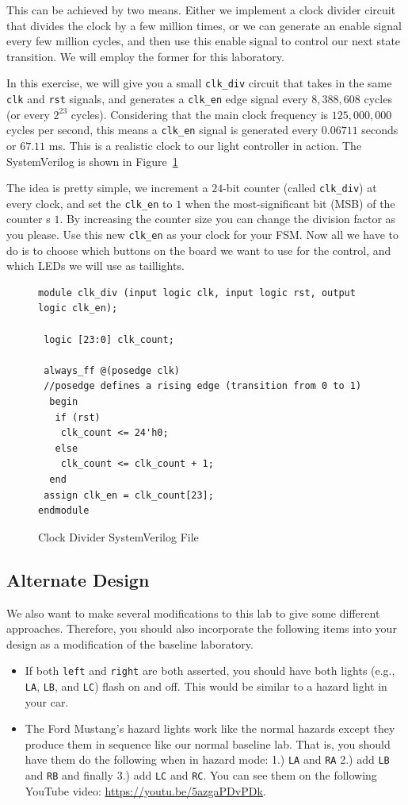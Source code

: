 \documentclass{article}
\begin{document}
This can be achieved by two means. Either we implement a clock divider
circuit that divides the clock by a few million times, or we can
generate an enable signal every few million cycles, and then use this
enable signal to control our next state transition.  We will employ
the former for this laboratory.

In this exercise, we will give you a small \verb!clk_div! circuit that takes
in the same \verb!clk! and \verb!rst! signals, and generates a
\verb!clk_en! edge signal
every $8,388,608$ cycles (or every $2^{23}$ cycles). Considering that
the main clock frequency is $125,000,000$ cycles per second, this means
a \verb!clk_en! signal is generated every $0.06711$ seconds
or $67.11$ ms.  This is a realistic clock to our light controller in action.
The SystemVerilog is shown in Figure~\ref{clk_div.sv}

The idea is pretty simple, we increment a $24$-bit counter (called
\verb!clk_div!) at every clock, and set the \verb!clk_en! to $1$ when
the most-significant bit (MSB) of the counter
s $1$. By increasing the counter size you can
change the division factor as you please.  Use this new \verb!clk_en!
as your clock for your FSM.
Now all we have to do is to choose which buttons on the board we want
to use for the control, and which LEDs we will use as
taillights.
\begin{figure}
\begin{verbatim}
module clk_div (input logic clk, input logic rst, output logic clk_en);

 logic [23:0] clk_count;

 always_ff @(posedge clk)
 //posedge defines a rising edge (transition from 0 to 1)
  begin
   if (rst)
    clk_count <= 24'h0;
   else
    clk_count <= clk_count + 1;
  end
 assign clk_en = clk_count[23];
endmodule
\end{verbatim}
\caption{Clock Divider SystemVerilog File}
\label{clk_div.sv}
\end{figure}


\subsection{Alternate Design}

We also want to make several modifications to this lab to give some
different approaches.  Therefore, you should also incorporate the
following items into your design as a modification of the baseline
laboratory.
\begin{itemize}
  \item If both \verb!left! and \verb!right! are both asserted, you
    should have both lights (e.g., \verb!LA!, \verb!LB!, and
    \verb!LC!) flash on and off.  This would be similar to a hazard
    light in your car.
    \item The Ford Mustang's hazard lights work like the normal
      hazards except they produce them in sequence like our normal
      baseline lab.  That is, you should have them do the following
      when in hazard mode: 1.) \verb!LA! and \verb!RA! 2.) add
      \verb!LB! and \verb!RB! and finally 3.) add \verb!LC! and
      \verb!RC!.  You can see them on the following YouTube video:
      \url{https://youtu.be/5azgaPDvPDk}.
\end{itemize}
\end{document}
